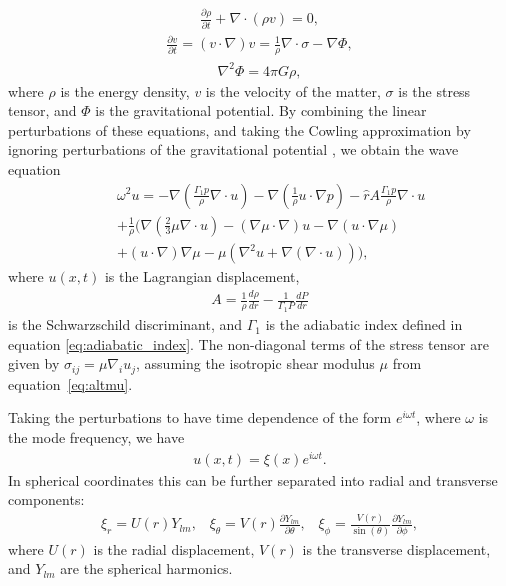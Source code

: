 \documentclass[fleqn,usenatbib]{mnras}
\begin{document}
\begin{align}
\frac{\partial\rho}{\partial t}+\nabla\cdot(\rho v)=0,
\label{eq:continuity_eqn}
\end{align}
\begin{align}
\frac{\partial v}{\partial t}=(v\cdot \nabla)v=\frac{1}{\rho}\nabla\cdot\sigma-\nabla\Phi,
\label{eq:momentum_eqn}
\end{align}
\begin{align}
\nabla^2\Phi=4\pi G\rho,
\label{eq:Poisson_eqn}
\end{align}
\noindent where $\rho$ is the energy density, $v$ is the velocity of the matter, $\sigma$ is the stress tensor, and $\Phi$ is the gravitational potential. By combining the linear perturbations of these equations, and taking the Cowling approximation by ignoring perturbations of the gravitational potential \citep{cowling1941non}, we obtain the wave equation
\begin{align}\nonumber
&&\omega^2u=-\nabla\left(\frac{\Gamma_1 p}{\rho}\nabla\cdot u\right)-\nabla\left(\frac{1}{\rho}u\cdot\nabla p\right)-\hat{r}A\frac{\Gamma_1 p}{\rho}\nabla\cdot u\\\nonumber
&&+\frac{1}{\rho}\biggr(\nabla\left(\frac{2}{3}\mu\nabla\cdot u\right)-\left(\nabla\mu\cdot\nabla\right)u-\nabla\left(u\cdot\nabla\mu\right)\\
&&+\left(u\cdot\nabla\right)\nabla\mu-\mu\left(\nabla^2 u+\nabla\left(\nabla\cdot u\right)\right)\biggr),
\label{eq:wave_eqn}
\end{align}
where $u(x,t)$ is the Lagrangian displacement,
\begin{align}
A=\frac{1}{\rho}\frac{d\rho}{dr}-\frac{1}{\Gamma_1P}\frac{dP}{dr}
\label{eq:schwartz_descrim}
\end{align}
\noindent is the Schwarzschild discriminant, and $\Gamma_1$ is the adiabatic index defined in equation \ref{eq:adiabatic_index}. The non-diagonal terms of the stress tensor are given by $\sigma_{ij} = \mu \nabla_i u_j$, assuming the isotropic shear modulus $\mu$ from equation~\ref{eq:altmu}.



Taking the perturbations to have time dependence of the form $e^{i\omega t}$, where $\omega$ is the mode frequency, we have 
\begin{align}
u(x,t)=\xi(x)e^{i\omega t}.
\label{eq:time_seperation}
\end{align}
\noindent In spherical coordinates this can be further separated into radial and transverse components:
\begin{align}
\xi_r=U(r)Y_{lm},\;\;\;\xi_{\theta}=V(r)\frac{\partial Y_{lm}}{\partial\theta},\;\;\;\xi_{\phi}=\frac{V(r)}{\sin(\theta)}\frac{\partial Y_{lm}}{\partial\phi},
\label{eq:xi_seperation}
\end{align}
\noindent where $U(r)$ is the radial displacement, $V(r)$ is the transverse displacement, and $Y_{lm}$ are the spherical harmonics.
\end{document}
